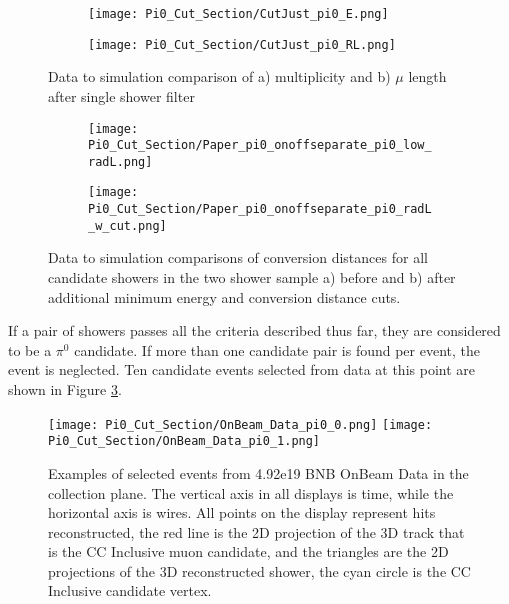 \begin{figure}[H]
\centering
  \begin{subfigure}[t]{0.4\textwidth}
    \centering
\texttt{[image: Pi0\_Cut\_Section/CutJust\_pi0\_E.png]}
  \caption{ }
  \end{subfigure} 
  \hspace{20mm}
  \begin{subfigure}[t]{0.4\textwidth}
    \centering
\texttt{[image: Pi0\_Cut\_Section/CutJust\_pi0\_RL.png]}
  \caption{ }
  \end{subfigure} 
\caption{ Data to simulation comparison of a) multiplicity and b) $\mu$ length after single shower filter }
\label{fig:cutjust_pi0_e}
\end{figure}

\begin{figure}[H]
\centering
  \begin{subfigure}[t]{0.4\textwidth}
    \centering
\texttt{[image: Pi0\_Cut\_Section/Paper\_pi0\_onoffseparate\_pi0\_low\_radL.png]}
  \caption{ }
  \end{subfigure} 
  \hspace{20mm}
  \begin{subfigure}[t]{0.4\textwidth}
    \centering
\texttt{[image: Pi0\_Cut\_Section/Paper\_pi0\_onoffseparate\_pi0\_radL\_w\_cut.png]}
  \caption{ }
  \end{subfigure} 
\caption{ Data to simulation comparisons of conversion distances for all candidate showers in the two shower sample a) before and b) after additional minimum energy and conversion distance cuts. }
\label{fig:physics_radl_before_after}
\end{figure}

\par If a pair of showers passes all the criteria described thus far, they are considered to be a $\pi^0$ candidate. If more than one candidate pair is found per event, the event is neglected.  Ten candidate events selected from data at this point are shown in Figure \ref{fig:physics_pi0_onbeam_eventdisplays}.
\begin{figure}[h!]
\centering
\texttt{[image: Pi0\_Cut\_Section/OnBeam\_Data\_pi0\_0.png]}
\texttt{[image: Pi0\_Cut\_Section/OnBeam\_Data\_pi0\_1.png]}
\caption{ Examples of selected events from 4.92e19 BNB OnBeam Data in the collection plane. The vertical axis in all displays is time, while the horizontal axis is wires. All points on the display represent hits reconstructed, the red line is the 2D projection of the 3D track that is the CC Inclusive muon candidate, and the triangles are the 2D projections of the 3D reconstructed shower, the cyan circle is the CC Inclusive candidate vertex. }
\label{fig:physics_pi0_onbeam_eventdisplays}
\end{figure}

